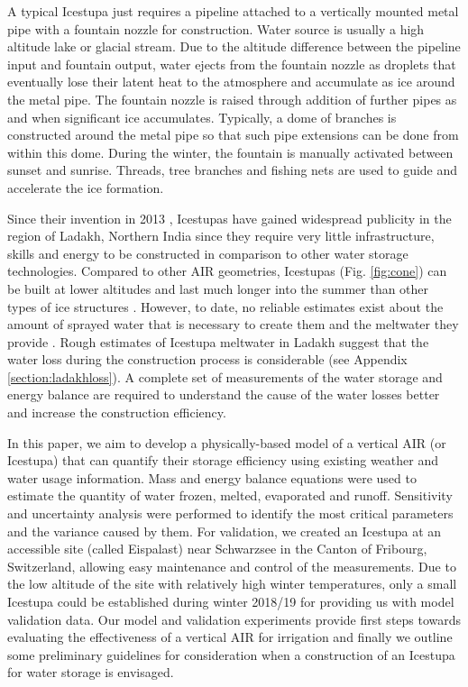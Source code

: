 \documentclass[utf8]{frontiersSCNS} %
\begin{document}
A typical Icestupa just requires a pipeline attached to a vertically mounted metal pipe with a fountain nozzle for
construction. Water source is usually a high altitude lake or glacial stream. Due to the altitude difference between
the pipeline input and fountain output, water ejects from the fountain nozzle as droplets that eventually lose their
latent heat to the atmosphere and accumulate as ice around the metal pipe. The fountain nozzle is raised through
addition of further pipes as and when significant ice accumulates. Typically, a dome of branches is constructed around
the metal pipe so that such pipe extensions can be done from within this dome. During the winter, the fountain is
manually activated between sunset and sunrise. Threads, tree branches and fishing nets are used to guide and accelerate
the ice formation.

Since their invention in 2013 \citep{campaign}, Icestupas have gained widespread publicity in the region of Ladakh,
Northern India since they require very little infrastructure, skills and energy to be constructed in comparison to
other water storage technologies. Compared to other AIR geometries, Icestupas (Fig.  \ref{fig:cone}) can be built at
lower altitudes and last much longer into the summer than other types of ice structures \citep{campaign}. However, to
date, no reliable estimates exist about the amount of sprayed water that is necessary to create them and the meltwater
they provide \citep{Nusser_2018}. Rough estimates of Icestupa meltwater in Ladakh suggest that the water loss during
the construction process is considerable (see Appendix \ref{section:ladakhloss}). A complete set of measurements of the
water storage and energy balance are required to understand the cause of the water losses better and increase the
construction efficiency.
 
In this paper, we aim to develop a physically-based model of a vertical AIR (or Icestupa) that can quantify their
storage efficiency using existing weather and water usage information. Mass and energy balance equations were used to
estimate the quantity of water frozen, melted, evaporated and runoff. Sensitivity and uncertainty analysis were
performed to identify the most critical parameters and the variance caused by them. For validation, we created an
Icestupa at an accessible site (called Eispalast) near Schwarzsee in the Canton of Fribourg, Switzerland, allowing easy
maintenance and control of the measurements. Due to the low altitude of the site with relatively high winter
temperatures, only a small Icestupa could be established during winter 2018/19 for providing us with model validation
data. Our model and validation experiments provide first steps towards evaluating the effectiveness of a vertical AIR
for irrigation and finally we outline some preliminary guidelines for consideration when a construction of an Icestupa
for water storage is envisaged. 
\end{document}
